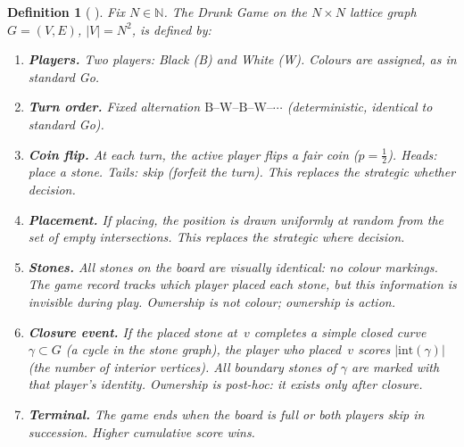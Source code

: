 \documentclass[11pt,a4paper]{article}
\newtheorem{definition}[theorem]{Definition}
\newcommand{\N}{\mathbb{N}}
\begin{document}
\begin{definition}[%
\begin{CJK}{UTF8}{gbsn}醉局\end{CJK}
--- the Drunk Game]\label{def:drunk-game}
Fix $N \in \N$.
The \emph{Drunk Game} on the $N \times N$ lattice graph
$G = (V, E)$, $|V| = N^2$, is defined by:
\begin{enumerate}[label=(\roman*),nosep]
\item \textbf{Players.}
  Two players: Black (B) and White (W).
  Colours are assigned, as in standard Go.
\item \textbf{Turn order.}
  Fixed alternation
  $\mathrm{B\text{--}W\text{--}B\text{--}W\text{--}}\cdots$
  (deterministic, identical to standard Go).
\item \textbf{Coin flip.}
  At each turn, the active player flips a fair coin
  ($p = \tfrac{1}{2}$).
  Heads: place a stone.
  Tails: skip (forfeit the turn).
  This replaces the strategic \emph{whether} decision.
\item \textbf{Placement.}
  If placing, the position is drawn uniformly at random
  from the set of empty intersections.
  This replaces the strategic \emph{where} decision.
\item \textbf{Stones.}
  All stones on the board are \emph{visually identical}:
  no colour markings.
  The game record tracks which player placed each stone,
  but this information is invisible during play.
  Ownership is not colour; ownership is \emph{action}.
\item \textbf{Closure event.}
  If the placed stone at~$v$ completes a simple closed
  curve $\gamma \subset G$ (a cycle in the stone graph),
  the player who placed~$v$ scores
  $|\mathrm{int}(\gamma)|$ (the number of interior
  vertices).
  All boundary stones of $\gamma$ are marked with that
  player's identity.
  Ownership is \emph{post-hoc}: it exists only after closure.
\item \textbf{Terminal.}
  The game ends when the board is full or both players
  skip in succession.
  Higher cumulative score wins.
\end{enumerate}
\end{definition}
\end{document}
